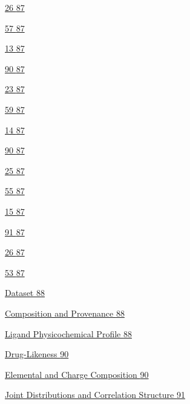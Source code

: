 \protect\hyperlink{_Toc235736169}{26 \protect\hyperlink{_Toc235736169}{87}}

\protect\hyperlink{_Toc235736170}{57 \protect\hyperlink{_Toc235736170}{87}}

\protect\hyperlink{_Toc235736171}{13 \protect\hyperlink{_Toc235736171}{87}}

\protect\hyperlink{_Toc235736172}{90 \protect\hyperlink{_Toc235736172}{87}}

\protect\hyperlink{_Toc235736173}{23 \protect\hyperlink{_Toc235736173}{87}}

\protect\hyperlink{_Toc235736174}{59 \protect\hyperlink{_Toc235736174}{87}}

\protect\hyperlink{_Toc235736175}{14 \protect\hyperlink{_Toc235736175}{87}}

\protect\hyperlink{_Toc235736176}{90 \protect\hyperlink{_Toc235736176}{87}}

\protect\hyperlink{_Toc235736177}{25 \protect\hyperlink{_Toc235736177}{87}}

\protect\hyperlink{_Toc235736178}{55 \protect\hyperlink{_Toc235736178}{87}}

\protect\hyperlink{_Toc235736179}{15 \protect\hyperlink{_Toc235736179}{87}}

\protect\hyperlink{_Toc235736180}{91 \protect\hyperlink{_Toc235736180}{87}}

\protect\hyperlink{_Toc235736181}{26 \protect\hyperlink{_Toc235736181}{87}}

\protect\hyperlink{_Toc235736182}{53 \protect\hyperlink{_Toc235736182}{87}}

\protect\hyperlink{dataset}{Dataset \protect\hyperlink{dataset}{88}}

\protect\hyperlink{composition-and-provenance}{Composition and Provenance \protect\hyperlink{composition-and-provenance}{88}}

\protect\hyperlink{ligand-physicochemical-profile}{Ligand Physicochemical Profile \protect\hyperlink{ligand-physicochemical-profile}{88}}

\protect\hyperlink{drug-likeness}{Drug-Likeness \protect\hyperlink{drug-likeness}{90}}

\protect\hyperlink{elemental-and-charge-composition}{Elemental and Charge Composition \protect\hyperlink{elemental-and-charge-composition}{90}}

\protect\hyperlink{joint-distributions-and-correlation-structure}{Joint Distributions and Correlation Structure \protect\hyperlink{joint-distributions-and-correlation-structure}{91}}

